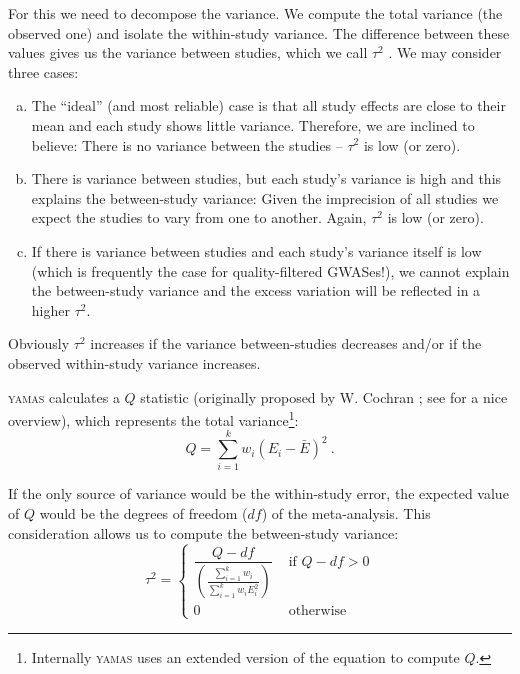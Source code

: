 For this we need to decompose the variance. We compute the total variance (the observed one) and isolate the within-study variance. The difference between these values gives us the variance between studies, which we call $\tau^2$ \citep{DerSimonian1986}. We may consider three cases:
\begin{enumerate}[a)]
 \item The ``ideal'' (and most reliable) case is that all study effects are close to their mean and each study shows little variance. Therefore, we are inclined to believe: There is no variance between the studies -- $\tau^2$ is low (or zero).
 \item There is variance between studies, but each study's variance is high and this explains the between-study variance: Given the imprecision of all studies we expect the studies to vary from one to another. Again, $\tau^2$ is low (or zero).
 \item If there is variance between studies and each study's variance itself is low (which is frequently the case for quality-filtered GWASes!), we cannot explain the between-study variance and the excess variation will be reflected in a higher $\tau^2$. 
\end{enumerate}

Obviously $\tau^2$ increases if the variance between-studies decreases and/or if the observed within-study variance increases.

\textsc{yamas} calculates a $Q$ statistic (originally proposed by W. Cochran \citep{Cochran1954}; see \citet{Huedo-Medina2006} for a nice overview), which represents the total variance\footnote{Internally \textsc{yamas} uses an extended version of the equation to compute $Q$.}:
\begin{equation}
 Q = \sum_{i=1}^{k} w_{i} \left(E_i - \bar{E} \right)^{2}~.
\end{equation}

If the only source of variance would be the within-study error, the expected value of $Q$ would be the degrees of freedom ($df$) of the meta-analysis. This consideration allows us to compute the between-study variance:
\begin{equation}
 \label{algo:eq:tau2}
 \tau^2 = \left\{ \begin{array}{rl}
 \dfrac{Q - df}{\left( \frac{\sum_{i=1}^{k} w_{i}}{\sum_{i=1}^{k} w_{i} E_{i}^{2}} \right) } & \mbox{ if $Q -df > 0$} \\
  0 &\mbox{ otherwise}
       \end{array} \right.
\end{equation}


